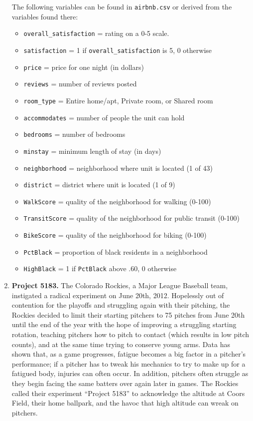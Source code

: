 \documentclass[
]{krantz}
\providecommand{\tightlist}{%
  \setlength{\itemsep}{0pt}\setlength{\parskip}{0pt}}
\begin{document}
\begin{enumerate}
  The following variables can be found in \texttt{airbnb.csv} or derived from the variables found there:

  \begin{itemize}
  \tightlist
  \item
    \texttt{overall\_satisfaction} = rating on a 0-5 scale.
  \item
    \texttt{satisfaction} = 1 if \texttt{overall\_satisfaction} is 5, 0 otherwise
  \item
    \texttt{price} = price for one night (in dollars)
  \item
    \texttt{reviews} = number of reviews posted
  \item
    \texttt{room\_type} = Entire home/apt, Private room, or Shared room
  \item
    \texttt{accommodates} = number of people the unit can hold
  \item
    \texttt{bedrooms} = number of bedrooms
  \item
    \texttt{minstay} = minimum length of stay (in days)
  \item
    \texttt{neighborhood} = neighborhood where unit is located (1 of 43)
  \item
    \texttt{district} = district where unit is located (1 of 9)
  \item
    \texttt{WalkScore} = quality of the neighborhood for walking (0-100)
  \item
    \texttt{TransitScore} = quality of the neighborhood for public transit (0-100)
  \item
    \texttt{BikeScore} = quality of the neighborhood for biking (0-100)
  \item
    \texttt{PctBlack} = proportion of black residents in a neighborhood
  \item
    \texttt{HighBlack} = 1 if \texttt{PctBlack} above .60, 0 otherwise
  \end{itemize}
\item
  \textbf{Project 5183.} The Colorado Rockies, a Major League Baseball team, instigated a radical experiment on June 20th, 2012. Hopelessly out of contention for the playoffs and struggling again with their pitching, the Rockies decided to limit their starting pitchers to 75 pitches from June 20th until the end of the year with the hope of improving a struggling starting rotation, teaching pitchers how to pitch to contact (which results in low pitch counts), and at the same time trying to conserve young arms. Data has shown that, as a game progresses, fatigue becomes a big factor in a pitcher's performance; if a pitcher has to tweak his mechanics to try to make up for a fatigued body, injuries can often occur. In addition, pitchers often struggle as they begin facing the same batters over again later in games. The Rockies called their experiment ``Project 5183'' to acknowledge the altitude at Coors Field, their home ballpark, and the havoc that high altitude can wreak on pitchers.


\end{enumerate}
\end{document}
